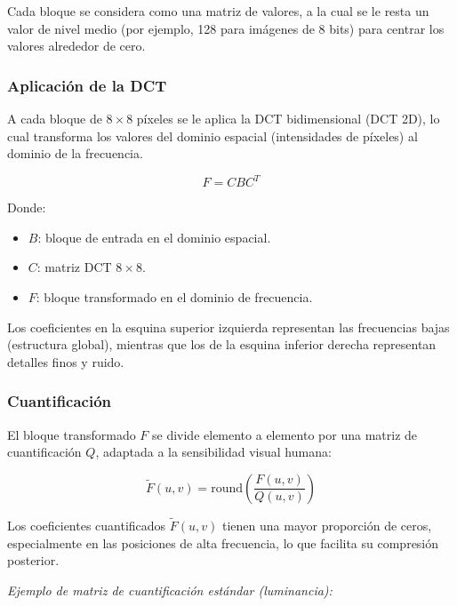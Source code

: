 \documentclass[8pt,a4paper]{article}
\theoremstyle{definition}
\theoremstyle{remark}
\begin{document}
\begin{multicols}{2}
            Cada bloque se considera como una matriz de valores, a la cual se le resta un valor de nivel medio (por ejemplo, 128 para imágenes de 8 bits) para centrar los valores alrededor de cero.
            
            \subsubsection{Aplicación de la DCT}
            
            A cada bloque de \( 8 \times 8 \) píxeles se le aplica la DCT bidimensional (DCT 2D), lo cual transforma los valores del dominio espacial (intensidades de píxeles) al dominio de la frecuencia.
            
            \[
            F=CBC^T
            \]
            
            Donde:
            
            \begin{itemize}
                \item \( B \): bloque de entrada en el dominio espacial.
                \item \( C \): matriz DCT \( 8 \times 8 \).
                \item \( F \): bloque transformado en el dominio de frecuencia.
            \end{itemize}
            
            Los coeficientes en la esquina superior izquierda representan las frecuencias bajas (estructura global), mientras que los de la esquina inferior derecha representan detalles finos y ruido.

            \subsubsection{Cuantificación}
            
            El bloque transformado \( F \) se divide elemento a elemento por una matriz de cuantificación \( Q \), adaptada a la sensibilidad visual humana:
            
            \[
            \tilde{F}(u,v) = \text{round}\left( \frac{F(u,v)}{Q(u,v)} \right)
            \]
            
            Los coeficientes cuantificados \( \tilde{F}(u,v) \) tienen una mayor proporción de ceros, especialmente en las posiciones de alta frecuencia, lo que facilita su compresión posterior.
            
            \textit{Ejemplo de matriz de cuantificación estándar (luminancia):}
            

\end{multicols}
\end{document}
